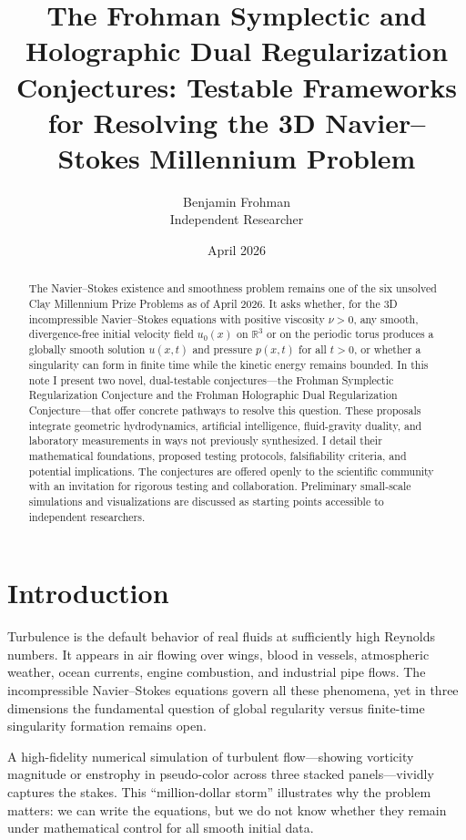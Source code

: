\documentclass[11pt,a4paper]{article}
\title{\textbf{The Frohman Symplectic and Holographic Dual Regularization Conjectures: Testable Frameworks for Resolving the 3D Navier--Stokes Millennium Problem}}
\author{Benjamin Frohman \\ Independent Researcher}
\date{April 2026}
\begin{document}
\maketitle

\begin{abstract}
The Navier--Stokes existence and smoothness problem remains one of the six unsolved Clay Millennium Prize Problems as of April 2026. It asks whether, for the 3D incompressible Navier--Stokes equations with positive viscosity $\nu > 0$, any smooth, divergence-free initial velocity field $u_0(x)$ on $\mathbb{R}^3$ or on the periodic torus produces a globally smooth solution $u(x,t)$ and pressure $p(x,t)$ for all $t > 0$, or whether a singularity can form in finite time while the kinetic energy remains bounded. In this note I present two novel, dual-testable conjectures---the Frohman Symplectic Regularization Conjecture and the Frohman Holographic Dual Regularization Conjecture---that offer concrete pathways to resolve this question. These proposals integrate geometric hydrodynamics, artificial intelligence, fluid-gravity duality, and laboratory measurements in ways not previously synthesized. I detail their mathematical foundations, proposed testing protocols, falsifiability criteria, and potential implications. The conjectures are offered openly to the scientific community with an invitation for rigorous testing and collaboration. Preliminary small-scale simulations and visualizations are discussed as starting points accessible to independent researchers.
\end{abstract}

\section{Introduction}
Turbulence is the default behavior of real fluids at sufficiently high Reynolds numbers. It appears in air flowing over wings, blood in vessels, atmospheric weather, ocean currents, engine combustion, and industrial pipe flows. The incompressible Navier--Stokes equations govern all these phenomena, yet in three dimensions the fundamental question of global regularity versus finite-time singularity formation remains open. 

A high-fidelity numerical simulation of turbulent flow---showing vorticity magnitude or enstrophy in pseudo-color across three stacked panels---vividly captures the stakes. This ``million-dollar storm'' illustrates why the problem matters: we can write the equations, but we do not know whether they remain under mathematical control for all smooth initial data.
\end{document}
